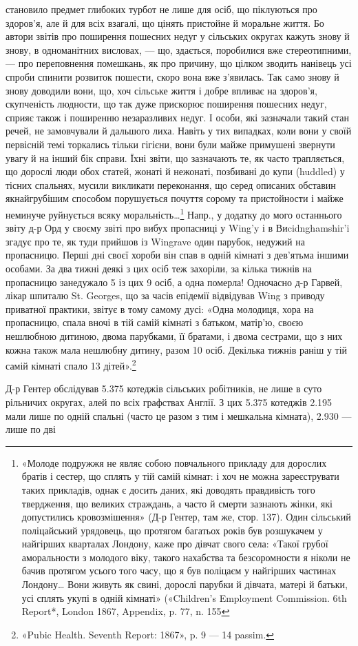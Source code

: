 \parcont{}  %
становило предмет глибоких турбот не лише для осіб, що піклуються
про здоров’я, але й для всіх взагалі, що цінять пристойне
й моральне життя. Бо автори звітів про поширення пошесних
недуг у сільських округах кажуть знову й знову, в одноманітних
висловах, — що, здається, поробилися вже стереотипними, — про
переповнення помешкань, як про причину, що цілком зводить
нанівець усі спроби спинити розвиток пошести, скоро вона вже
з’явилась. Так само знову й знову доводили вони, що, хоч сільське
життя і добре впливає на здоров’я, скупченість людности,
що так дуже прискорює поширення пошесних недуг, сприяє
також і поширенню незаразливих недуг. І особи, які зазначали
такий стан речей, не замовчували й дальшого лиха. Навіть у тих
випадках, коли вони у своїй первісній темі торкались тільки
гігієни, вони були майже примушені звернути увагу й на інший
бік справи. Їхні звіти, що зазначають те, як часто трапляється, що
дорослі люди обох статей, жонаті й нежонаті, позбивані до купи
(huddled) у тісних спальнях, мусили викликати переконання,
що серед описаних обставин якнайгрубішим способом порушується
почуття сорому та пристойности і майже неминуче руйнується
всяку моральність\dots{}\footnote{
«Молоде подружжя не являє собою повчального прикладу для
дорослих братів і сестер, що сплять у тій самій кімнат: і хоч не можна
зареєструвати таких прикладів, однак є досить даних, які доводять правдивість
того твердження, що великих страждань, а часто й смерти зазнають
жінки, які допустились кровозмішення» (Д-р Гентер, там же, стор. 137).
Один сільський поліцайський урядовець, що протягом багатьох років
був розшукачем у найгірших кварталах Лондону, каже про дівчат свого
села: «Такої грубої аморальности з молодого віку, такого нахабства
та безсоромности я ніколи не бачив протягом усього того часу, що я був
поліцаєм у найгірших частинах Лондону\dots{} Вони живуть як свині, дорослі
парубки й дівчата, матері й батьки, усі сплять укупі в одній кімнаті»
(«Children’s Employment Commission. 6th Report*, London 1867, Appendix,
p. 77, n. 155
} Напр., у додатку до мого останнього звіту
д-р Орд у своєму звіті про вибух пропасниці у Wing’y і в Виcidnghamshir’i
згадує про те, як туди прийшов із Wingrave один
парубок, недужий на пропасницю. Перші дні своєї хороби він
спав в одній кімнаті з дев’ятьма іншими особами. За два тижні
деякі з цих осіб теж захоріли, за кілька тижнів на пропасницю
занедужало 5 із цих 9 осіб, а одна померла! Одночасно
д-р Гарвей, лікар шпиталю St. Georges, що за часів епідемії відвідував
Wing з приводу приватної практики, звітує в тому самому
дусі: «Одна молодиця, хора на пропасницю, спала вночі
в тій самій кімнаті з батьком, матір’ю, своєю нешлюбною дитиною,
двома парубками, її братами, і двома сестрами, що з них
кожна також мала нешлюбну дитину, разом 10 осіб. Декілька
тижнів раніш у тій самій кімнаті спало 13 дітей».\footnote{
«Pubic Health. Seventh Report: 1867», p. 9 — 14 passim.
}

Д-р Гентер обслідував 5.375 котеджів сільських робітників,
не лише в суто рільничих округах, алей по всіх графствах
Англії. З цих 5.375 котеджів 2.195 мали лише по одній спальні
(часто це разом з тим і мешкальна кімната), 2.930 — лише по дві
\parbreak{}  %
